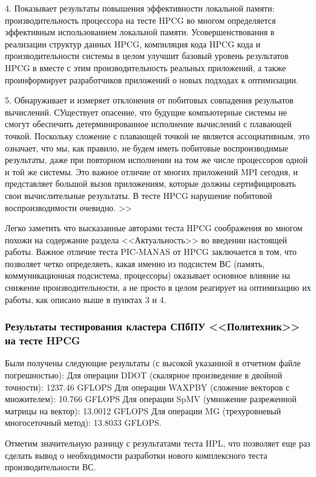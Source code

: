 4. Показывает результаты повышения эффективности локальной памяти: производительность процессора
на тесте HPCG во многом определяется эффективным использованием локальной памяти.
Усовершенствования в реализации структур данных HPCG, компиляция кода HPCG
кода и производительности системы в целом улучшит базовый уровень результатов HPCG
в вместе с этим производительность реальных приложений, а также проинформирует разработчиков приложений о новых подходах к оптимизации.

5. Обнаруживает и измеряет отклонения от побитовых совпадения резульатов вычислений.
СУществует опасение, что будущие компьютерные системы не смогут обеспечить детерминированное исполнение
 вычислений с плавающей точкой. Поскольку сложение с плавающей точкой не является ассоциативным,
это означает, что мы, как правило, не будем иметь побитовые воспроизводимые результаты, даже при повторном исполнении на том же числе процессоров одной и той же системы.
Это важное отличие от многих приложений MPI сегодня, и представляет большой
вызов приложениям, которые должны сертифицировать свои вычислительные результаты. В тесте  HPCG нарушение побитовой воспроизводимости очевидно. >>

Легко заметить что высказанные авторами теста HPCG соображения во многом похожи на содержание раздела <<Актуальность>> во введении настоящей работы. Важное отличие теста PIC-MANAS от HPCG заключается в том, что позволяет четко определяеть, какая именно из подсистем ВС (память, коммуникационная подсистема, процессоры) оказывает основное влияние на снижение производительности, а не просто в целом реагирует на оптимизацию их работы, как описано выше в пунктах 3 и 4.

 
\subsubsection{Результаты тестирования кластера СПбПУ <<Политехник>> на тесте HPCG}

Были получены следующие результаты (с высокой указанной в отчетном файле погрешностью):
Для операции DDOT (скалярное произведение в двойной точности): 1237.46 GFLOPS
Для операции WAXPBY (сложение векторов с множителем): 10.766 GFLOPS
Для операции SpMV (умножение разреженной матрицы на вектор): 13.0012  GFLOPS
Для операции MG (трехуровневый многосеточный метод): 13.8033 GFLOPS.

Отметим значительную разницу с результатами теста HPL, что позволяет еще раз сделать вывод о необходимости разработки нового комплексного теста производительности ВС.
